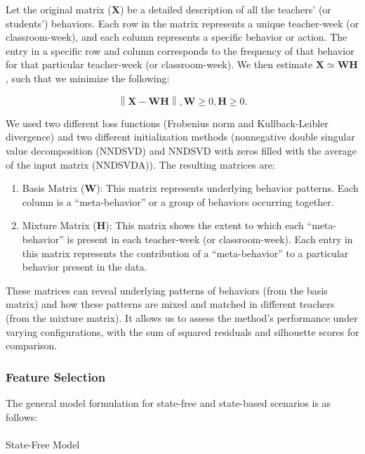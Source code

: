 \documentclass[
  number,
  preprint,
  3p,
  onecolumn]{elsarticle}
\makeatletter
\let\oldparagraph\paragraph
\renewcommand{\paragraph}{
    \@ifstar
      \xxxParagraphStar
      \xxxParagraphNoStar
  }
\newcommand{\xxxParagraphStar}[1]{\oldparagraph*{#1}\mbox{}}
\newcommand{\xxxParagraphNoStar}[1]{\oldparagraph{#1}\mbox{}}
\providecommand{\tightlist}{%
  \setlength{\itemsep}{0pt}\setlength{\parskip}{0pt}}\usepackage{longtable,booktabs,array}
\makeatother
\begin{document}
Let the original matrix (\(\mathbf{X}\)) be a detailed description of
all the teachers' (or students') behaviors. Each row in the matrix
represents a unique teacher-week (or classroom-week), and each column
represents a specific behavior or action. The entry in a specific row
and column corresponds to the frequency of that behavior for that
particular teacher-week (or classroom-week). We then estimate
\(\mathbf{X} \simeq \mathbf{W}\mathbf{H}\), such that we minimize the
following:

\[
\left\| \mathbf{X} - \mathbf{W}\mathbf{H} \right\| , \mathbf{W} \geq 0, \mathbf{H} \geq 0.
\]

We used two different loss functions (Frobenius norm and
Kullback-Leibler divergence) and two different initialization methods
(nonnegative double singular value decomposition (NNDSVD) and NNDSVD
with zeros filled with the average of the input matrix (NNDSVDA)). The
resulting matrices are:

\begin{enumerate}
\def\labelenumi{\arabic{enumi}.}
\tightlist
\item
  Basis Matrix (\(\mathbf{W}\)): This matrix represents underlying
  behavior patterns. Each column is a ``meta-behavior'' or a group of
  behaviors occurring together.
\item
  Mixture Matrix (\(\mathbf{H}\)): This matrix shows the extent to which
  each ``meta-behavior'' is present in each teacher-week (or
  classroom-week). Each entry in this matrix represents the contribution
  of a ``meta-behavior'' to a particular behavior present in the data.
\end{enumerate}

These matrices can reveal underlying patterns of behaviors (from the
basis matrix) and how these patterns are mixed and matched in different
teachers (from the mixture matrix). It allows us to assess the method's
performance under varying configurations, with the sum of squared
residuals and silhouette scores for comparison.

\subsubsection{Feature Selection}\label{feature-selection-1}

The general model formulation for state-free and state-based scenarios
is as follows:

\paragraph{State-Free Model}\label{state-free-model}
\end{document}
